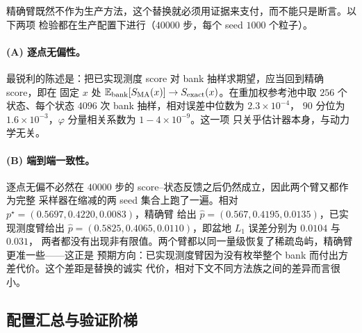 \documentclass[11pt,a4paper]{article}
\newcommand{\E}{\mathbb{E}}
\begin{document}
精确臂既然不作为生产方法，这个替换就必须用证据来支付，而不能只是断言。以下两项
检验都在生产配置下进行（$40000$ 步，每个 seed $1000$ 个粒子）。

\paragraph{(A) 逐点无偏性。}
最锐利的陈述是：把已实现测度 score 对 bank 抽样求期望，应当回到精确 score，即在
固定 $x$ 处 $\E_{\rm bank}[S_{\rm MA}(x)]\to S_{\rm exact}(x)$。在重加权参考池中取
$256$ 个状态、每个状态 $4096$ 次 bank 抽样，相对误差中位数为 $2.3\times10^{-4}$，
$90$ 分位为 $1.6\times10^{-3}$，$\varphi$ 分量相关系数为 $1-4\times10^{-9}$。这一项
只关乎估计器本身，与动力学无关。

\paragraph{(B) 端到端一致性。}
逐点无偏不必然在 $40000$ 步的 score--状态反馈之后仍然成立，因此两个臂又都作为完整
采样器在缩减的两 seed 集合上跑了一遍。相对 $p^\star=(0.5697,0.4220,0.0083)$，精确臂
给出 $\widehat p=(0.567,0.4195,0.0135)$，已实现测度臂给出
$\widehat p=(0.5825,0.4065,0.0110)$，即盆地 $L_1$ 误差分别为 $0.0104$ 与 $0.031$，
两者都没有出现非有限值。两个臂都以同一量级恢复了稀疏岛屿，精确臂更准一些——这正是
预期方向：已实现测度臂因为没有枚举整个 bank 而付出方差代价。这个差距是替换的诚实
代价，相对下文不同方法族之间的差异而言很小。

\subsection{配置汇总与验证阶梯}
\end{document}
